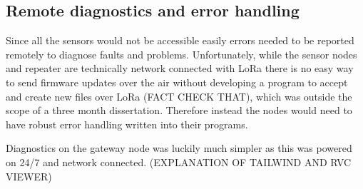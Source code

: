 \subsection{Remote diagnostics and error handling}

Since all the sensors would not be accessible easily errors needed to be
reported remotely to diagnose faults and problems. Unfortunately, while the
sensor nodes and repeater are technically network connected with LoRa there is
no easy way to send firmware updates over the air without developing a program
to accept and create new files over LoRa (FACT CHECK THAT), which was outside
the scope of a three month dissertation. Therefore instead the nodes would need
to have robust error handling written into their programs.

Diagnostics on the gateway node was luckily much simpler as this was powered on
24/7 and network connected. (EXPLANATION OF TAILWIND AND RVC VIEWER)
